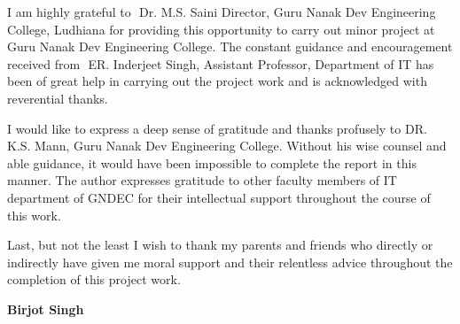 \begin{Large}
\end{Large}
\vskip 0.1in I am  highly grateful to ​
Dr. M.S. Saini Director, Guru Nanak Dev Engineering  
College, Ludhiana for providing this opportunity to carry out minor project at Guru Nanak  
Dev Engineering College. The constant guidance and encouragement received from ​
ER. Inderjeet Singh, Assistant Professor, Department of IT has been of great help in carrying out the project work and is acknowledged with reverential thanks.

I would like to express a deep sense of gratitude and thanks profusely to DR. K.S. Mann, Guru Nanak Dev Engineering College. Without his wise counsel and able guidance, it would have been impossible to complete the report in this manner. The author expresses gratitude to other faculty members of IT department of GNDEC for their intellectual support throughout the course of this work.

Last, but not the least I wish to thank my parents and friends who directly or indirectly have given me moral support and their relentless advice throughout the completion of this project work. 

\vskip 0.4in
\noindent \textbf{Birjot Singh}

